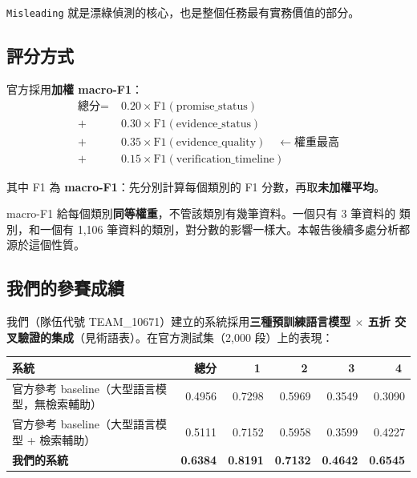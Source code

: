 \documentclass[11pt,a4paper]{ctexart}
\newcommand{\fieldname}[1]{\texttt{#1}}
\begin{document}
\fieldname{Misleading} 就是漂綠偵測的核心，也是整個任務最有實務價值的部分。

\subsection{評分方式}

官方採用\textbf{加權 macro-F1}：
\begin{align*}
\text{總分} =\; & 0.20 \times \mathrm{F1}(\text{promise\_status}) \\
              + & 0.30 \times \mathrm{F1}(\text{evidence\_status}) \\
              + & 0.35 \times \mathrm{F1}(\text{evidence\_quality}) \quad \leftarrow \text{權重最高} \\
              + & 0.15 \times \mathrm{F1}(\text{verification\_timeline})
\end{align*}

其中 F1 為 \textbf{macro-F1}：先分別計算每個類別的 F1 分數，再取\textbf{未加權平均}。

\begin{tcolorbox}[colback=yellow!8, colframe=orange!60, title=關鍵性質]
macro-F1 給每個類別\textbf{同等權重}，不管該類別有幾筆資料。一個只有 3 筆資料的
類別，和一個有 1{,}106 筆資料的類別，對分數的影響一樣大。本報告後續多處分析都
源於這個性質。
\end{tcolorbox}

\subsection{我們的參賽成績}

我們（隊伍代號 TEAM\_10671）建立的系統採用\textbf{三種預訓練語言模型 $\times$ 五折
交叉驗證的集成}（見術語表）。在官方測試集（2{,}000 段）上的表現：

\begin{table}[h]
\centering
\small
\begin{tabular}{@{}lrrrrr@{}}
\toprule
系統 & 總分 & \textcircled{1} & \textcircled{2} & \textcircled{3} & \textcircled{4} \\
\midrule
官方參考 baseline（大型語言模型，無檢索輔助） & 0.4956 & 0.7298 & 0.5969 & 0.3549 & 0.3090 \\
官方參考 baseline（大型語言模型 + 檢索輔助）   & 0.5111 & 0.7152 & 0.5958 & 0.3599 & 0.4227 \\
\textbf{我們的系統}                       & \textbf{0.6384} & \textbf{0.8191} & \textbf{0.7132} & \textbf{0.4642} & \textbf{0.6545} \\
\bottomrule
\end{tabular}
\end{table}
\end{document}
